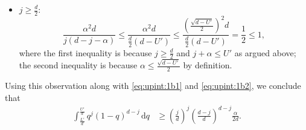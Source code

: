 \documentclass[onecolumn,letterpaper]{IEEEtran}
\newcommand{\cp}{{q}}
\newcommand{\up}{{U}}
\newcommand{\lw}{{L}}
\newcommand*{\dif}{{\,\mathrm{d}}}
\newcommand{\ap}{{\alpha}}
\begin{document}
\begin{IEEEproof}
\begin{itemize}
\item \underline{$j \geq \frac{d}{2}$}:
\begin{equation*}
\frac{\ap^2  d}{j(d-j-\ap)} \leq \frac{\ap^2  d}{\frac d 2(d-\up')}\leq \frac{\left(\frac{\sqrt{d-\up'}}{2}\right)^2 d }{\frac d 2 \left(d-\up'\right)} = \frac{1}{2} \leq 1,
\end{equation*}
where the first inequality is because $j\geq  \frac{d}{2}$ and $j+\ap\leq \up'$ as argued above; the second inequality is because $\ap \leq \frac{\sqrt{d-\up'}}{2}$ by definition. 
\end{itemize}
Using this observation along with \eqref{eq:upint:1b1} and \eqref{eq:upint:1b2}, we conclude that  
\begin{align*}
\int_{\frac {\lw'}{d}}^{\frac {\up'}{d}} \cp^j (1-\cp)^{d-j} \dif \cp %
&\ge \left( \frac{j}{d} \right)^j \left( \frac{d-j}{d} \right)^{d-j} \frac{\ap}{2d}.
\end{align*}



\end{IEEEproof}
\end{document}
